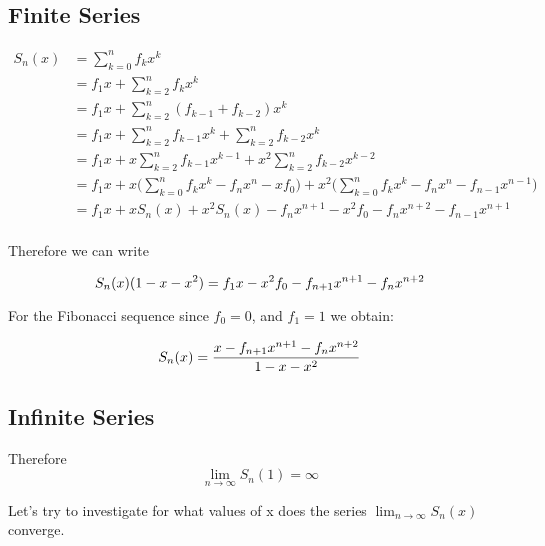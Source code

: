 \documentclass[a4paper]{article}
\begin{document}
\subsection{Finite Series}
\begin{equation}
\begin{split}
S_{n}(x) & = \sum_{k=0}^{n} f_k x^k \\
 & = f_1 x + \sum_{k=2}^{n} f_k x^k \\
 & = f_1 x + \sum_{k=2}^{n} (f_{k-1} + f_{k-2}) x^k \\ 
 & = f_1 x + \sum_{k=2}^{n} f_{k-1} x^k + \sum_{k=2}^{n} f_{k-2} x^k \\
  & = f_1 x + x \sum_{k=2}^{n} f_{k-1} x^{k-1} + x^2 \sum_{k=2}^{n} f_{k-2} x^{k-2} \\
  & = f_1 x + x \Big( \sum_{k=0}^{n} f_{k} x^{k} - f_n x^n  - x f_0 \Big) + x^2 \Big( \sum_{k=0}^{n} f_{k} x^{k} - f_n x^n - f_{n-1} x^{n-1} \Big) \\ 
  & = f_1 x + x S_{n}(x) + x^2 S_{n}(x) - f_{n}x^{n+1} - x^2 f_0 - f_n x^{n+2} - f_{n-1} x^{n+1}\\ 
\end{split}
\end{equation}

Therefore we can write 

\begin{equation}
S_{n}(x) (1 - x -x^2 ) = f_1 x - x^2 f_0 - f_{n+1}x^{n+1} - f_n x^{n+2}\\ 
\end{equation}

For the Fibonacci sequence since $f_0 = 0$, and  $f_1 = 1$ we obtain:

\begin{equation}
S_{n}(x) = \frac{x - f_{n+1}x^{n+1} - f_n x^{n+2}}{1 - x -x^2 }  \\ 
\end{equation}


\subsection{Infinite Series}
Therefore 
\begin{equation}
\lim_{n \to \infty} S_n(1) = \infty
\end{equation}

Let's try to investigate for what values of x does the series $\lim_{n \to \infty} S_n(x)$ converge.
\end{document}
